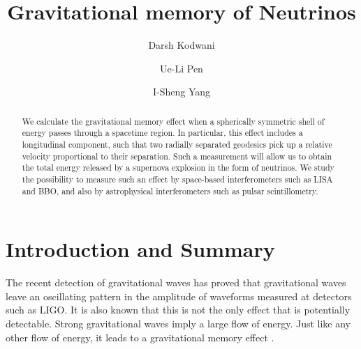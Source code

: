 \documentclass[aps,showpacs,onecolumn,floats,prd,superscriptaddress,nofootinbib]{revtex4-1}
\begin{document}
\title{Gravitational memory of Neutrinos}

\author{Darsh Kodwani}

\author{Ue-Li Pen}

\author{I-Sheng Yang}

\begin{abstract}

We calculate the gravitational memory effect when a spherically symmetric shell of energy passes through a spacetime region. In particular, this effect includes a longitudinal component, such that two radially separated geodesics pick up a relative velocity proportional to their separation. Such a measurement will allow us to obtain the total energy released by a supernova explosion in the form of neutrinos. We study the possibility to measure such an effect by space-based interferometers such as LISA and BBO, and also by astrophysical interferometers such as pulsar scintillometry.

\end{abstract}

\maketitle

\section{Introduction and Summary}

The recent detection of gravitational waves \cite{GW1509} has proved that gravitational waves leave an oscillating pattern in the amplitude of waveforms measured at detectors such as LIGO. It is also known that this is not the only effect that is potentially detectable. Strong gravitational waves imply a large flow of energy. Just like any other flow of energy, it leads to a gravitational memory effect \cite{Christodoulou_effect,GW_memory}. 
\end{document}
